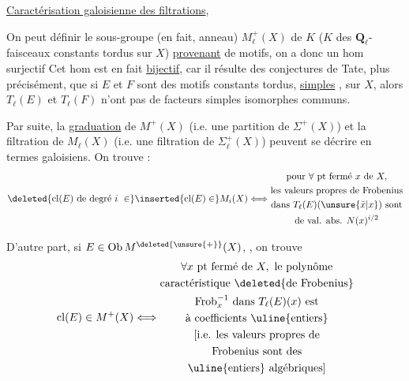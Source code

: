\uline{Caractérisation galoisienne des filtrations},

On peut définir le sous-groupe (en fait, anneau) $M_\ell^+(X)$ de $K$ ($K$ des  $\mathbf{Q}_\ell$-faisceaux constants tordus sur $X$) \uline{provenant} de motifs, on a donc un hom surjectif
 Cet hom est en fait \uline{bijectif}, car il résulte des conjectures de Tate, plus précisément, que si $E$ et $F$ sont des motifs constants tordus, \uline{simples} , sur $X$, alors $T_\ell(E)$ et $T_\ell(F)$  n'ont pas de facteurs simples isomorphes communs.

Par suite,  la  \uline{graduation} de $M^+(X)$ (i.e. une partition de $\Sigma^+(X)$) et la filtration de $M_\ell(X)$ (i.e. une filtration de $\Sigma_\ell^+(X)$) peuvent se décrire en termes galoisiens. On trouve  :
\[
\deleted{\mathrm{cl}(E)\text{ de degré }i\ \in}\inserted{\mathrm{cl}(E)\in}M_i(X)
\Longleftrightarrow
\begin{gathered}
\text{pour }\forall\text{ pt fermé }x\text{ de }X,\\
\text{les valeurs propres de Frobenius}\\
\text{dans }T_\ell(E)(\unsure{\bar{x}|x})\text{ sont}\\
\text{de val. abs. }N(x)^{i/2}
\end{gathered}
\]

D'autre part, si $E\in\mathrm{Ob}\,M^{\deleted{\unsure{+}}}(X)$, , on trouve
\[
\mathrm{cl}(E)\in M^+(X)\Longleftrightarrow
\begin{gathered}
\forall x\text{ pt fermé de }X,\text{ le polynôme}\\
\text{caractéristique }\deleted{\text{de Frobenius}}\\
\mathrm{Frob}^{-1}_x\text{ dans }T_\ell(E)(x)\text{ est}\\
\text{à coefficients }\uline{\text{entiers}}\\
[\text{i.e. les valeurs propres de}\\
\text{Frobenius sont des}\\
\uline{\text{entiers}}\text{ algébriques}]
\end{gathered}
\]

